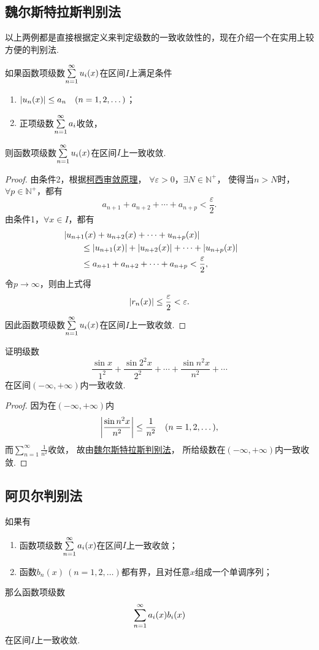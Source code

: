 \subsection{魏尔斯特拉斯判别法}
以上两例都是直接根据定义来判定级数的一致收敛性的，现在介绍一个在实用上较方便的判别法.
\begin{theorem}[魏尔斯特拉斯判别法]\label{theorem:无穷级数.魏尔斯特拉斯判别法}
如果函数项级数\(\sum\limits_{n=1}^\infty u_i(x)\)在区间\(I\)上满足条件\begin{enumerate}
\item \(\abs{u_n(x)} \leq a_n \quad(n=1,2,\dotsc)\)；
\item 正项级数\(\sum\limits_{n=1}^\infty a_i\)收敛，
\end{enumerate}
则函数项级数\(\sum\limits_{n=1}^\infty u_i(x)\)在区间\(I\)上一致收敛.
\begin{proof}
由条件2，根据\hyperref[theorem:无穷级数.级数的柯西审敛原理]{柯西审敛原理}，
\(\forall\varepsilon>0\)，\(\exists N \in \mathbb{N}^+\)，
使得当\(n > N\)时，\(\forall p \in \mathbb{N}^+\)，都有\[
a_{n+1} + a_{n+2} + \dotsb + a_{n+p} < \frac{\varepsilon}{2}.
\]由条件1，\(\forall x \in I\)，都有\begin{align*}
&\hspace{-20pt}\abs{u_{n+1}(x) + u_{n+2}(x) + \dotsb + u_{n+p}(x)} \\
&\leq \abs{u_{n+1}(x)} + \abs{u_{n+2}(x)} + \dotsb + \abs{u_{n+p}(x)} \\
&\leq a_{n+1} + a_{n+2} + \dotsb + a_{n+p} < \frac{\varepsilon}{2},
\end{align*}令\(p\to\infty\)，则由上式得\[
\abs{r_n(x)} \leq \frac{\varepsilon}{2} < \varepsilon.
\]因此函数项级数\(\sum\limits_{n=1}^\infty u_i(x)\)在区间\(I\)上一致收敛.
\end{proof}
\end{theorem}

\begin{example}
证明级数\[
\frac{\sin x}{1^2}
+ \frac{\sin 2^2 x}{2^2}
+ \dotsb
+ \frac{\sin n^2 x}{n^2}
+ \dotsb
\]在区间\((-\infty,+\infty)\)内一致收敛.
\begin{proof}
因为在\((-\infty,+\infty)\)内\[
\abs{\frac{\sin n^2 x}{n^2}} \leq \frac{1}{n^2}
\quad(n=1,2,\dotsc),
\]而\(\sum\limits_{n=1}^\infty \frac{1}{n^2}\)收敛，
故由\hyperref[theorem:无穷级数.魏尔斯特拉斯判别法]{魏尔斯特拉斯判别法}，
所给级数在\((-\infty,+\infty)\)内一致收敛.
\end{proof}
\end{example}

\subsection{阿贝尔判别法}
\begin{theorem}[阿贝尔判别法]\label{theorem:无穷级数.阿贝尔判别法}
如果有
\begin{enumerate}
\item 函数项级数\(\sum\limits_{n=1}^\infty a_i(x)\)在区间\(I\)上一致收敛；
\item 函数\(b_n(x)\ (n=1,2,\dotsc)\)都有界，且对任意\(x\)组成一个单调序列；
\end{enumerate}
那么函数项级数\[
\sum\limits_{n=1}^\infty a_i(x) b_i(x)
\]
在区间\(I\)上一致收敛.
\end{theorem}

